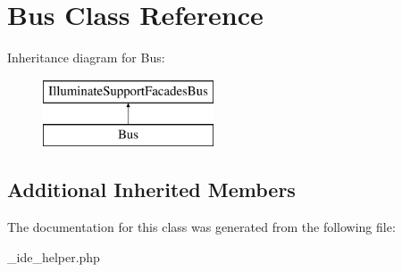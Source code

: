 \hypertarget{class_bus}{}\section{Bus Class Reference}
\label{class_bus}
Inheritance diagram for Bus\+:\begin{figure}[H]
\begin{center}
\leavevmode
\includegraphics[height=2.000000cm]{class_bus}
\end{center}
\end{figure}
\subsection*{Additional Inherited Members}


The documentation for this class was generated from the following file\+:\begin{DoxyCompactItemize}
\item 
\+\_\+ide\+\_\+helper.\+php\end{DoxyCompactItemize}
